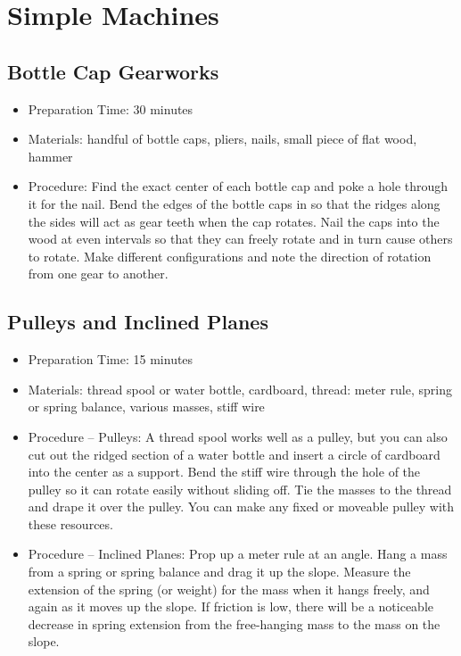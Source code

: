 \section{Simple Machines}

\subsection{Bottle Cap Gearworks}
\begin{itemize}
\item{Preparation Time: 30 minutes}
\item{Materials: handful of bottle caps, pliers, nails, small piece of flat wood, hammer}
\item{Procedure: Find the exact center of each bottle cap and poke a hole through it for the nail. Bend the edges of the bottle caps in so that the ridges along the sides will act as gear teeth when the cap rotates. Nail the caps into the wood at even intervals so that they can freely rotate and in turn cause others to rotate. Make different configurations and note the direction of rotation from one gear to another.}
\end{itemize}

\subsection{Pulleys and Inclined Planes}
\begin{itemize}
\item{Preparation Time: 15 minutes}
\item{Materials: thread spool or water bottle, cardboard, thread: meter rule, spring or spring balance, various masses, stiff wire}
\item{Procedure – Pulleys: A thread spool works well as a pulley, but you can also cut out the ridged section of a water bottle and insert a circle of cardboard into the center as a support. Bend the stiff wire through the hole of the pulley so it can rotate easily without sliding off. Tie the masses to the thread and drape it over the pulley. You can make any fixed or moveable pulley with these resources.}
\item{Procedure – Inclined Planes: Prop up a meter rule at an angle. Hang a mass from a spring or spring balance and drag it up the slope. Measure the extension of the spring (or weight) for the mass when it hangs freely, and again as it moves up the slope. If friction is low, there will be a noticeable decrease in spring extension from the free-hanging mass to the mass on the slope.}
\end{itemize}

